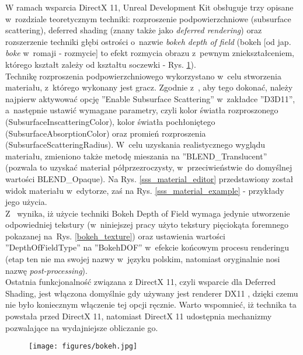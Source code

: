 W ramach wsparcia DirectX 11, Unreal Development Kit obsługuje trzy opisane w~rozdziale teoretycznym techniki: rozproszenie podpowierzchniowe (subsurface scattering), deferred shading (znany także jako \emph{deferred rendering}) oraz rozszerzenie techniki głębi ostrości o~nazwie \emph{bokeh depth of field} (bokeh [od jap. \emph{boke} w~romaji - rozmycie] to efekt rozmycia obrazu z~pewnym zniekształceniem, którego kształt zależy od kształtu soczewki - Rys. \ref{bokeh_example}).\\

Technikę rozproszenia podpowierzchniowego wykorzystano w~celu stworzenia materiału, z~którego wykonany jest gracz. Zgodnie z~\cite{udk_sss}, aby tego dokonać, należy najpierw aktywować opcję ''Enable Subsurface Scattering'' w~zakładce ''D3D11'', a~następnie ustawić wymagane parametry, czyli kolor światła rozproszonego (SubsurfaceInscatteringColor), kolor światła pochłoniętego (SubsurfaceAbsorptionColor) oraz promień rozproszenia (SubsurfaceScatteringRadius). W~celu uzyskania realistycznego wyglądu materiału, zmieniono także metodę mieszania na ''BLEND\_Translucent'' (pozwala to uzyskać materiał półprzezroczysty, w~przeciwieństwie do domyślnej wartości BLEND\_Opaque). Na Rys. \ref{sss_material_editor} przedstawiony został widok materiału w~edytorze, zaś na Rys. \ref{sss_material_example} - przykłady jego użycia.\\

Z~\cite{udk_bokeh_dof} wynika, iż użycie techniki Bokeh Depth of Field wymaga jedynie utworzenie odpowiedniej tekstury (w~niniejszej pracy użyto tekstury pięciokąta foremnego pokazanej na~Rys. \ref{bokeh_texture}) oraz ustawienia wartości ''DepthOfFieldType'' na ''BokehDOF'' w~efekcie końcowym procesu renderingu (etap ten nie ma swojej nazwy w~języku polskim, natomiast oryginalnie nosi nazwę \emph{post-processing}).\\

Ostatnia funkcjonalność związana z DirectX 11, czyli wsparcie dla Deferred Shading, jest włączona domyślnie gdy używany jest renderer DX11 \cite{udk_deferred_shading}, dzięki czemu nie było koniecznym włączenie tej opcji ręcznie. Warto wspomnieć, iż technika ta powstała przed DirectX 11, natomiast DirectX 11 udostępnia mechanizmy pozwalające na wydajniejsze obliczanie go.

\begin{figure}
\begin{center}
\texttt{[image: figures/bokeh.jpg]}
\label{bokeh_example}
\end{center}
\end{figure}

